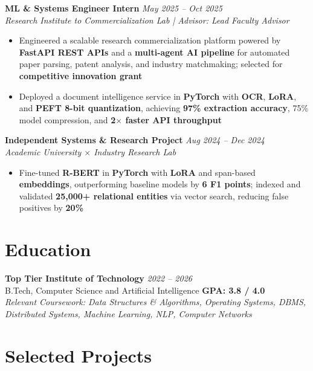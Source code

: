 \documentclass[10pt]{article}
\begin{document}
\textbf{ML \& Systems Engineer Intern} \hfill \textcolor{subheadingcolor}{\textit{May 2025 -- Oct 2025}} \\
\textit{Research Institute to Commercialization Lab | Advisor: Lead Faculty Advisor}
\begin{itemize}
    \item Engineered a scalable research commercialization platform powered by \textbf{FastAPI REST APIs} and a \textbf{multi-agent AI pipeline} for automated paper parsing, patent analysis, and industry matchmaking; selected for \textbf{competitive innovation grant}
    \item Deployed a document intelligence service in \textbf{PyTorch} with \textbf{OCR}, \textbf{LoRA}, and \textbf{PEFT 8-bit quantization}, achieving \textbf{97\% extraction accuracy}, 75\% model compression, and \textbf{2$\times$ faster API throughput}
\end{itemize}
\vspace{-0.3em}

\textbf{Independent Systems \& Research Project} \hfill \textcolor{subheadingcolor}{\textit{Aug 2024 -- Dec 2024}} \\
\textit{Academic University $\times$ Industry Research Lab}
\begin{itemize}
    \item Fine-tuned \textbf{R-BERT} in \textbf{PyTorch} with \textbf{LoRA} and span-based \textbf{embeddings}, outperforming baseline models by \textbf{6 F1 points}; indexed and validated \textbf{25,000+ relational entities} via vector search, reducing false positives by \textbf{20\%}
\end{itemize}
\vspace{-0.45em}

\section*{Education}
\textbf{Top Tier Institute of Technology} \hfill \textit{2022 -- 2026} \\
B.Tech, Computer Science and Artificial Intelligence \hfill \textbf{GPA: 3.8 / 4.0} \\[0.05em]
{\small \textit{Relevant Coursework: Data Structures \& Algorithms, Operating Systems, DBMS, Distributed Systems, Machine Learning, NLP, Computer Networks}}
\vspace{-0.35em}

\section*{Selected Projects}
\end{document}
